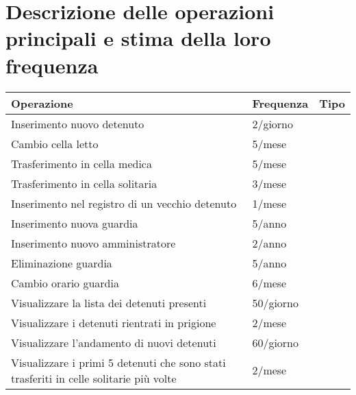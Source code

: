 \documentclass[a4paper,12pt]{report}
\begin{document}
\section{Descrizione delle operazioni principali e stima della loro frequenza}
\begin{table}[H]
\begin{tabular}{p{9cm} p{2cm} p{1cm}}
\hline
Operazione & Frequenza & Tipo \\ \hline
Inserimento nuovo detenuto & 2/giorno &  \\
Cambio cella letto & 5/mese &  \\
Trasferimento in cella medica & 5/mese & \\
Trasferimento in cella solitaria & 3/mese & \\
Inserimento nel registro di un vecchio detenuto & 1/mese & \\
Inserimento nuova guardia & 5/anno & \\
Inserimento nuovo amministratore & 2/anno & \\
Eliminazione guardia & 5/anno & \\
Cambio orario guardia & 6/mese & \\
Visualizzare la lista dei detenuti presenti & 50/giorno & \\
Visualizzare i detenuti rientrati in prigione & 2/mese & \\
Visualizzare l'andamento di nuovi detenuti & 60/giorno & \\
Visualizzare i primi 5 detenuti che sono stati trasferiti in celle solitarie più volte & 2/mese &
\end{tabular}
\end{table}
\end{document}
